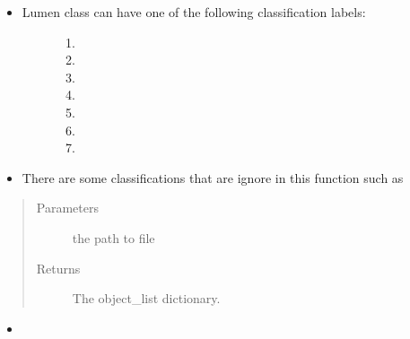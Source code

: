\documentclass[letterpaper,10pt,english]{sphinxmanual}
\begin{document}
\begin{fulllineitems}
\begin{description}
\begin{itemize}
\item {} \begin{description}
\item[{Lumen class can have one of the following classification labels:}] \leavevmode\begin{enumerate}
\def\theenumi{\arabic{enumi}}
\def\labelenumi{\theenumi .}
\makeatletter\def\p@enumii{\p@enumi \theenumi .}\makeatother
\item {} 

\item {} 

\item {} 

\item {} 

\item {} 

\item {} 

\item {} 

\end{enumerate}

\end{description}

\item {} 
There are some classifications that are ignore in this function such as 

\end{itemize}

\end{description}
\begin{quote}\begin{description}
\item[{Parameters}] \leavevmode
{} \textendash{} the path to  file

\item[{Returns}] \leavevmode
The object\_list dictionary.

\end{description}\end{quote}



\begin{itemize}
\item {} 
{\hyperref[\detokenize{index:util.read_oct_roi_file.read_oct_roi_file}]{}}

\end{itemize}



\end{fulllineitems}
\end{document}
